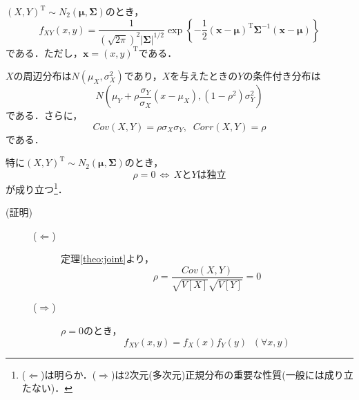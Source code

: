 \documentclass{jsreport}
\begin{document}
$(X, Y)^{\mathrm{T}} \sim N_2(\bm{\mu}, \bm{\Sigma})$のとき，
\begin{equation}
  f_{XY}(x, y) = \frac{1}{(\sqrt{2\pi})^2 |\bm{\Sigma}|^{1/2}} \exp\left\{
  -\frac{1}{2} (\bm{x} - \bm{\mu})^{\mathrm{T}} \bm{\Sigma}^{-1} (\bm{x}-\bm{\mu})
  \right\} \nonumber
\end{equation}
である．ただし，$\bm{x} = (x, y)^{\mathrm{T}}$である．

$X$の周辺分布は$N(\mu_X, \sigma_X^2)$であり，$X$を与えたときの$Y$の条件付き分布は
\begin{equation}
  N\left(\mu_Y + \rho \frac{\sigma_Y}{\sigma_X}(x - \mu_X), (1 - \rho^2)\sigma_Y^2\right) \nonumber
\end{equation}
である．さらに，
\begin{equation}
  Cov(X, Y) = \rho \sigma_X \sigma_Y, \;  \; Corr(X, Y) = \rho \nonumber
\end{equation}
である．

特に$(X, Y)^{\mathrm{T}} \sim N_2(\bm{\mu}, \bm{\Sigma})$のとき，
\begin{equation}
  \rho = 0 \, \Longleftrightarrow \, XとYは独立 \nonumber
\end{equation}
が成り立つ\footnote{
($\Longleftarrow$)は明らか．($\Longrightarrow$)は2次元(多次元)正規分布の重要な性質(一般には成り立たない)．
}．
\begin{description}
  \item[(証明)]
  \begin{description}
    \item[($\Longleftarrow$)]
    定理\ref{theo:joint}より，
    \begin{equation}
      \rho = \frac{Cov(X, Y)}{\sqrt{V[X]}\sqrt{V[Y]}} = 0 \nonumber
    \end{equation}
    \item[($\Longrightarrow$)]
    $\rho = 0$のとき，
    \begin{equation}
      f_{XY}(x, y) = f_X(x)f_Y(y) \; \; (\forall x, y) \nonumber
    \end{equation}
  \end{description}
\end{description}
\end{document}

